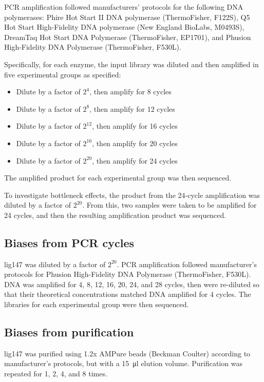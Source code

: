 \documentclass[parskip=full, numbers=noenddot]{scrreprt}
\begin{document}
PCR amplification followed manufacturers' protocols for the following DNA polymerases: Phire Hot Start II DNA polymerase (ThermoFisher, F122S), Q5 Hot Start High-Fidelity DNA polymerase (New England BioLabs, M0493S), DreamTaq Hot Start DNA Polymerase (ThermoFisher, EP1701), and Phusion High-Fidelity DNA Polymerase (ThermoFisher, F530L).

Specifically, for each enzyme, the input library was diluted and then amplified in five experimental groups as specified:

\begin{itemize}
  \item Dilute by a factor of $2^{4}$, then amplify for 8 cycles
  \item Dilute by a factor of $2^{8}$, then amplify for 12 cycles
  \item Dilute by a factor of $2^{12}$, then amplify for 16 cycles
  \item Dilute by a factor of $2^{16}$, then amplify for 20 cycles
  \item Dilute by a factor of $2^{20}$, then amplify for 24 cycles
\end{itemize}

The amplified product for each experimental group was then sequenced.

To investigate bottleneck effects, the product from the 24-cycle amplification was diluted by a factor of $2^{20}$.  From this, two samples were taken to be amplified for 24 cycles, and then the resulting amplification product was sequenced.

\subsection{Biases from PCR cycles}
\label{ssec:pcrbias_methods_pcr}

lig147 was diluted by a factor of $2^{20}$.  PCR amplification followed manufacturer's protocols for Phusion High-Fidelity DNA Polymerase (ThermoFisher, F530L).  DNA was amplified for 4, 8, 12, 16, 20, 24, and 28 cycles, then were re-diluted so that their theoretical concentrations matched DNA amplified for 4 cycles.  The libraries for each experimental group were then sequenced.

\subsection{Biases from purification}
\label{ssec:pcrbias_methods_pur}

lig147 was purified using 1.2x AMPure beads (Beckman Coulter) according to manufacturer's protocols, but with a \SI{15}{\micro\litre} elution volume.  Purification was repeated for 1, 2, 4, and 8 times.
\end{document}
